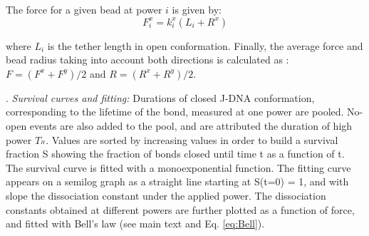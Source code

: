 \documentclass{biophys-new}
\begin{document}

%
The force for a given bead at power $i$ is given by:
\begin{equation}
\label{eq:Force}
F^x_i = k^x_i(L_i + R^x)
\end{equation}

\noindent where $L_i$ is the tether length in open conformation. Finally, the average force and bead radius taking into account both directions is calculated as : $F = (F^x + F^y)/2$ and $R = (R^x + R^y)/2$.


. \textit{Survival curves and fitting:}
Durations of closed J-DNA conformation, corresponding to the lifetime of the bond, measured at one power are pooled. No-open events are also added to the pool, and are attributed the duration of high power $T_{^H}$. Values are sorted by increasing values in order to build a survival fraction S showing the fraction of bonds closed until time t as a function of t. The survival curve is fitted with a monoexponential function. The fitting curve appears on a semilog graph as a straight line starting at S(t=0) = 1, and with slope the dissociation constant under the applied power. The dissociation constants obtained at different powers are further plotted as a function of force, and fitted with Bell's law (see main text and Eq. \ref{eq:Bell}).



%
%
\end{document}
